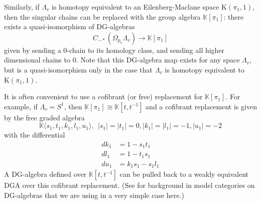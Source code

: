 \documentclass{gtpart}
\newcommand{\K}{\mathbb{K}}
\begin{document}
Similarly, if $\Lambda_v$ is homotopy equivalent to an Eilenberg-Maclane space $\mathrm{K}(\pi_1,1)$, then the singular chains can be replaced with the group algebra $\K[\pi_1]$: there exists a
quasi-isomorphism of DG-algebras 
\[ 
C_{-*}(\Omega_{p_v} \Lambda_v) \to \K [\pi_1] 
\] 
given by
sending a $0$-chain to its homology class, and sending all higher dimensional chains to 0. Note that this DG-algebra
map exists for any space $\Lambda_v$, but is a quasi-isomorphism only in the case that $\Lambda_v$ is
homotopy equivalent to $\mathrm{K}(\pi_1,1)$.

It is often convenient to use a cofibrant (or free) replacement for $\K[\pi_1]$. For example, 
if $\Lambda_v = S^1$, then $\K[\pi_1] \cong \K[t,t^{-1}]$ and a cofibrant replacement is given by
the free graded algebra
\[ \mathbb{K} \langle s_1, t_1, k_1, l_1, u_1 \rangle, \ \ |s_1|=|t_1|=0, |k_1|=|l_1|=-1,
|u_1|= -2 \] 
with the differential 
\begin{align*}
    dk_1 &= 1 - s_1 t_1 \\
    dl_1 &= 1 - t_1 s_1 \\
    du_1 &= k_1 s_1 - s_1 l_1 
\end{align*}
A DG-algebra defined over $\K[t,t^{-1}]$ can be pulled back to a weakly equivalent DGA over this cofibrant
replacement. (See \cite{tabuada} for background in model categories on DG-algebras that we are using in a very simple case here.) 
\end{document}
